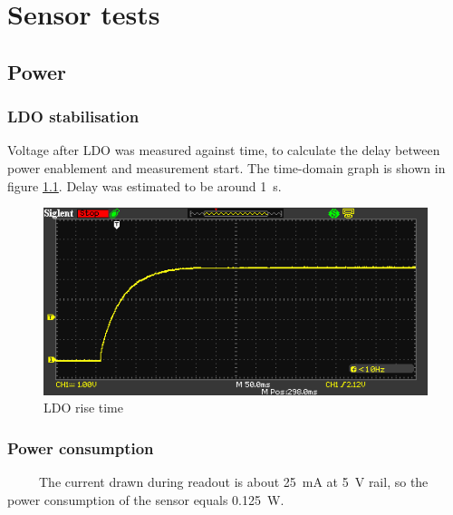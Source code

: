 \chapter{Sensor tests}


\section{Power}
    \subsection{LDO stabilisation}
        Voltage after LDO was measured against time, to calculate the delay between power enablement and measurement start. The time-domain graph is shown in figure \ref{LDO_rise_time}. Delay was estimated to be around \SI{1}{\second}.

        \begin{figure}[H]
            \centering
            \includegraphics[width=0.8\paperwidth]{img/07/rise_time.png}
            \caption{LDO rise time}
            \label{LDO_rise_time}
        \end{figure}

    \subsection{Power consumption}
        The current drawn during readout is about \SI{25}{\milli\ampere} at \SI{5}{\volt} rail, so the power consumption of the sensor equals \SI{0.125}{\watt}.

